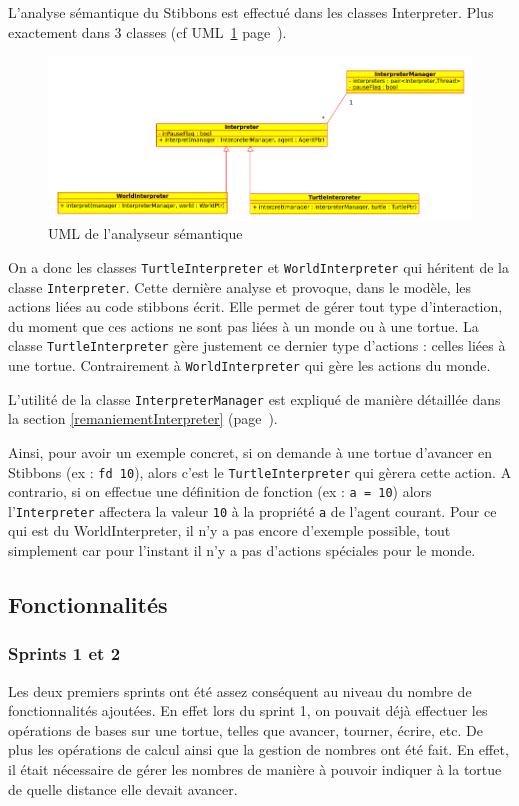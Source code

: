 L'analyse sémantique du Stibbons est effectué dans les classes Interpreter. Plus exactement dans 3 classes (cf UML~\ref{interpreterUML} page~\pageref{interpreterUML}).

\begin{figure}[h]
\caption{\label{interpreterUML} UML de l'analyseur sémantique}
\includegraphics[scale=0.5]{doc/report/uml/interpreterUML.png}
\end{figure}

On a donc les classes \verb|TurtleInterpreter| et \verb|WorldInterpreter| qui héritent de la classe \verb|Interpreter|. Cette dernière analyse et provoque, dans le modèle, les actions liées au code stibbons écrit. Elle permet de gérer tout type d'interaction, du moment que ces actions ne sont pas liées à un monde ou à une tortue. La classe \verb|TurtleInterpreter| gère justement ce dernier type d'actions : celles liées à une tortue. Contrairement à \verb|WorldInterpreter| qui gère les actions du monde.

L'utilité de la classe \verb|InterpreterManager| est expliqué de manière détaillée dans la section \ref{remaniementInterpreter} (page~\pageref{remaniementInterpreter}).

Ainsi, pour avoir un exemple concret, si on demande à une tortue d'avancer en Stibbons (ex : \verb|fd 10|), alors c'est le \verb|TurtleInterpreter| qui gèrera cette action.
A contrario, si on effectue une définition de fonction (ex : \verb|a = 10|) alors l'\verb|Interpreter| affectera la valeur \verb|10| à la propriété \verb|a| de l'agent courant.
Pour ce qui est du WorldInterpreter, il n'y a pas encore d'exemple possible, tout simplement car pour l'instant il n'y a pas d'actions spéciales pour le monde.

\subsection{Fonctionnalités}

\subsubsection{Sprints 1 et 2}
Les deux premiers sprints ont été assez conséquent au niveau du nombre de fonctionnalités ajoutées.
En effet lors du sprint 1, on pouvait déjà effectuer les opérations de bases sur une tortue, telles que avancer, tourner, écrire, etc. De plus les opérations de calcul ainsi que la gestion de nombres ont été fait. En effet, il était nécessaire de gérer les nombres de manière à pouvoir indiquer à la tortue de quelle distance elle devait avancer.

